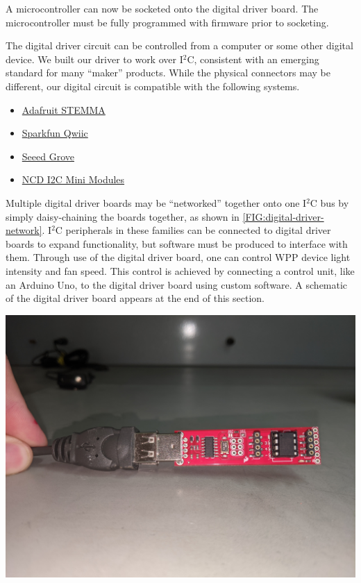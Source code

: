 \documentclass[11pt]{article}
\begin{document}
A microcontroller can now be socketed onto the digital driver board.
The microcontroller must be fully programmed with firmware prior to socketing.

The digital driver circuit can be controlled from a computer or some other digital device.
We built our driver to work over I$^2$C, consistent with an emerging standard for many ``maker'' products.
While the physical connectors may be different, our digital circuit is compatible with the following systems.

\begin{itemize}
  \item \href{https://learn.adafruit.com/introducing-adafruit-stemma-qt}{Adafruit STEMMA}
  \item \href{https://www.sparkfun.com/qwiic}{Sparkfun Qwiic}
  \item \href{https://www.seeedstudio.com/category/Grove-c-1003.html}{Seeed Grove}
  \item \href{https://store.ncd.io/?fwp_product_type=i2c-mini-modules}{NCD I2C Mini Modules}
\end{itemize}

Multiple digital driver boards may be ``networked'' together onto one I$^2$C bus by simply daisy-chaining the boards together, as shown in \autoref{FIG:digital-driver-network}.
I$^2$C peripherals in these families can be connected to digital driver boards to expand functionality, but software must be produced to interface with them.
Through use of the digital driver board, one can control WPP device light intensity and fan speed.
This control is achieved by connecting a control unit, like an Arduino Uno, to the digital driver board using custom software.
A schematic of the digital driver board appears at the end of this section.

\begin{center}
  \includegraphics[width=\textwidth/2]{"./tiny-programmer.jpg"}
\end{center}
\end{document}
